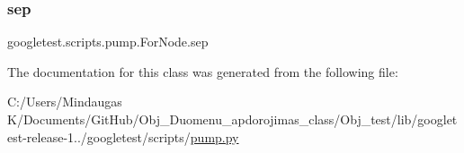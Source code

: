 \subsubsection{\texorpdfstring{sep}{sep}}
{\footnotesize\ttfamily googletest.\+scripts.\+pump.\+For\+Node.\+sep}



The documentation for this class was generated from the following file\+:\begin{DoxyCompactItemize}
\item 
C\+:/\+Users/\+Mindaugas K/\+Documents/\+Git\+Hub/\+Obj\+\_\+\+Duomenu\+\_\+apdorojimas\+\_\+class/\+Obj\+\_\+test/lib/googletest-\/release-\/1../googletest/scripts/\mbox{\hyperlink{_obj__test_2lib_2googletest-release-1_88_81_2googletest_2scripts_2pump_8py}{pump.\+py}}\end{DoxyCompactItemize}
